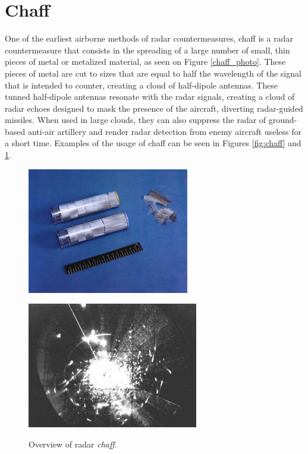 \documentclass[english,purist]{ist-report}
\begin{document}
\section{Chaff}

One of the earliest airborne methods of radar countermeasures, chaff is a radar countermeasure that consists in the spreading of a large number of small, thin pieces of metal or metalized material, as seen on Figure \ref{chaff_photo}. These pieces of metal are cut to sizes that are equal to half the wavelength of the signal that is intended to counter, creating a cloud of half-dipole antennas. These tunned half-dipole antennas resonate with the radar signals, creating a cloud of radar echoes designed to mask the presence of the aircraft, diverting radar-guided missiles. When used in large clouds, they can also suppress the radar of ground-based anti-air artillery and render radar detection from enemy aircraft useless for a short time. Examples of the usage of chaff can be seen in Figures \ref{fig:chaff} and \ref{chaff_cloud_echo}.

\begin{figure}[ht]
    \begin{minipage}[b]{0.49\linewidth}
            \centering
            \includegraphics[height=5.5cm]{Usnchaff.jpg}
            \label{chaff_photo}
    \end{minipage}
    \hfill
    \begin{minipage}[b]{0.49\linewidth}
            \centering
            \includegraphics[height=5.5cm]{chaff_radarjpg.jpg}
            \label{chaff_cloud_echo}
    \end{minipage}
    \caption{Overview of radar \textit{chaff}.}
\end{figure}
\end{document}
